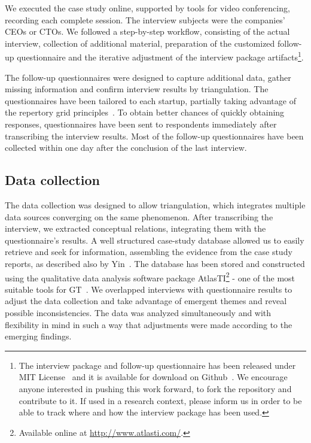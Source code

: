 \documentclass[10pt,journal,letterpaper,compsoc]{IEEEtran}
\begin{document}
We executed the case study online, supported by tools for video conferencing,
recording each complete session. The interview subjects were the companies' CEOs
or CTOs. We followed a step-by-step workflow, consisting of the actual
interview, collection of additional material, preparation of the customized
follow-up questionnaire and the iterative adjustment of the interview package
artifacts\footnote{The interview package and follow-up questionnaire has been
released under MIT License~\cite{MITLicense} and it is available for download on
Github~\cite{GitHubInterviewPackage}. We encourage anyone interested in pushing
this work forward, to fork the repository and contribute to it. If used in a
research context, please inform us in order to be able to track where and how
the interview package has been used.}.

The follow-up questionnaires were designed to capture additional data, gather
missing information and confirm interview results by triangulation. The
questionnaires have been tailored to each startup, partially taking advantage of
the repertory grid principles~\cite{Edwards2009}. To obtain better chances of
quickly obtaining responses, questionnaires have been sent to respondents
immediately after transcribing the interview results. Most of the follow-up
questionnaires have been collected within one day after the conclusion of the
last interview.  

\subsection{Data collection} 
The data collection was designed to allow triangulation, which integrates 
multiple data sources converging on the same phenomenon. After transcribing the 
interview, we extracted conceptual relations, integrating them with the 
questionnaire's results. A well structured case-study database allowed us to 
easily retrieve and seek for information, assembling the evidence from the case 
study reports, as described also by Yin~\cite{Yin1994}. The database has been 
stored and constructed using the qualitative data analysis software package 
AtlasTI\footnote{Available online at \url{http://www.atlasti.com/}.} - one of 
the most suitable tools for GT~\cite{Coleman2007}. We overlapped interviews with 
questionnaire results to adjust the data collection and take advantage of 
emergent themes and reveal possible inconsistencies. The data was analyzed 
simultaneously and with flexibility in mind in such a way that adjustments were 
made according to the emerging findings.
\end{document}
